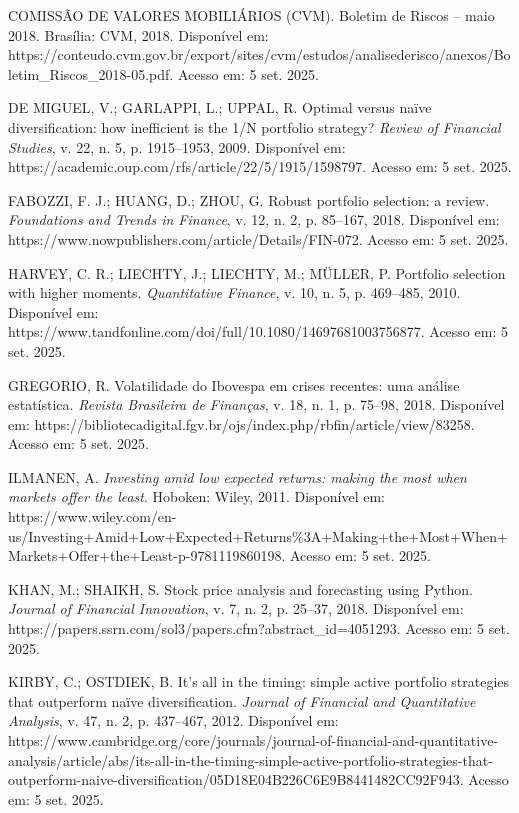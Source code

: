 \begin{thebibliography}{99}
COMISSÃO DE VALORES MOBILIÁRIOS (CVM). Boletim de Riscos -- maio 2018. Brasília: CVM, 2018. Disponível em: https://conteudo.cvm.gov.br/export/sites/cvm/estudos/analisederisco/anexos/Boletim\_Riscos\_2018-05.pdf. Acesso em: 5 set. 2025.

DE MIGUEL, V.; GARLAPPI, L.; UPPAL, R. Optimal versus naïve diversification: how inefficient is the 1/N portfolio strategy? \textit{Review of Financial Studies}, v. 22, n. 5, p. 1915--1953, 2009. Disponível em: https://academic.oup.com/rfs/article/22/5/1915/1598797. Acesso em: 5 set. 2025.

FABOZZI, F. J.; HUANG, D.; ZHOU, G. Robust portfolio selection: a review. \textit{Foundations and Trends in Finance}, v. 12, n. 2, p. 85--167, 2018. Disponível em: https://www.nowpublishers.com/article/Details/FIN-072. Acesso em: 5 set. 2025.

HARVEY, C. R.; LIECHTY, J.; LIECHTY, M.; MÜLLER, P. Portfolio selection with higher moments. \textit{Quantitative Finance}, v. 10, n. 5, p. 469--485, 2010. Disponível em: https://www.tandfonline.com/doi/full/10.1080/14697681003756877. Acesso em: 5 set. 2025.

GREGORIO, R. Volatilidade do Ibovespa em crises recentes: uma análise estatística. \textit{Revista Brasileira de Finanças}, v. 18, n. 1, p. 75--98, 2018. Disponível em: https://bibliotecadigital.fgv.br/ojs/index.php/rbfin/article/view/83258. Acesso em: 5 set. 2025.

ILMANEN, A. \textit{Investing amid low expected returns: making the most when markets offer the least}. Hoboken: Wiley, 2011. Disponível em: https://www.wiley.com/en-us/Investing+Amid+Low+Expected+Returns\%3A+Making+the+Most+When+Markets+Offer+the+Least-p-9781119860198. Acesso em: 5 set. 2025.

KHAN, M.; SHAIKH, S. Stock price analysis and forecasting using Python. \textit{Journal of Financial Innovation}, v. 7, n. 2, p. 25--37, 2018. Disponível em: https://papers.ssrn.com/sol3/papers.cfm?abstract\_id=4051293. Acesso em: 5 set. 2025.

KIRBY, C.; OSTDIEK, B. It's all in the timing: simple active portfolio strategies that outperform naïve diversification. \textit{Journal of Financial and Quantitative Analysis}, v. 47, n. 2, p. 437--467, 2012. Disponível em: https://www.cambridge.org/core/journals/journal-of-financial-and-quantitative-analysis/article/abs/its-all-in-the-timing-simple-active-portfolio-strategies-that-outperform-naive-diversification/05D18E04B226C6E9B8441482CC92F943. Acesso em: 5 set. 2025.


\end{thebibliography}
